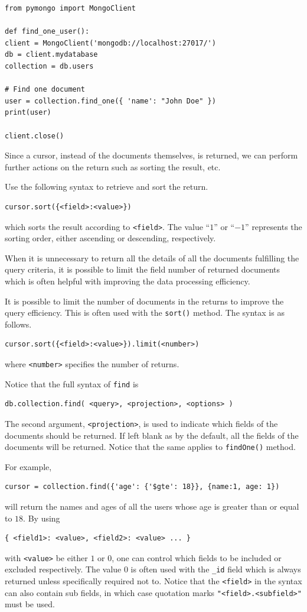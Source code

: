 \begin{lstlisting}
from pymongo import MongoClient

def find_one_user():
client = MongoClient('mongodb://localhost:27017/')
db = client.mydatabase
collection = db.users

# Find one document
user = collection.find_one({ 'name': "John Doe" })
print(user)

client.close()
\end{lstlisting}

Since a cursor, instead of the documents themselves, is returned, we can perform further actions on the return such as sorting the result, etc.

Use the following syntax to retrieve and sort the return.
\begin{lstlisting}
cursor.sort({<field>:<value>})
\end{lstlisting}
which sorts the result according to \verb|<field>|. The value ``$1$'' or ``$-1$'' represents the sorting order, either ascending or descending, respectively.

When it is unnecessary to return all the details of all the documents fulfilling the query criteria, it is possible to limit the field number of returned documents which is often helpful with improving the data processing efficiency.

It is possible to limit the number of documents in the returns to improve the query efficiency. This is often used with the \verb|sort()| method. The syntax is as follows.
\begin{lstlisting}
cursor.sort({<field>:<value>}).limit(<number>)
\end{lstlisting}
where \verb|<number>| specifies the number of returns.

Notice that the full syntax of \verb|find| is
\begin{lstlisting}
db.collection.find( <query>, <projection>, <options> )
\end{lstlisting}
The second argument, \verb|<projection>|, is used to indicate which fields of the documents should be returned. If left blank as by the default, all the fields of the documents will be returned. Notice that the same applies to \verb|findOne()| method.

For example,
\begin{lstlisting}
cursor = collection.find({'age': {'$gte': 18}}, {name:1, age: 1})
\end{lstlisting}
will return the names and ages of all the users whose age is greater than or equal to $18$. By using
\begin{lstlisting}
{ <field1>: <value>, <field2>: <value> ... }
\end{lstlisting}
with \verb|<value>| be either $1$ or $0$, one can control which fields to be included or excluded respectively. The value $0$ is often used with the \verb|_id| field which is always returned unless specifically required not to. Notice that the \verb|<field>| in the syntax can also contain sub fields, in which case quotation marks \verb|"<field>.<subfield>"| must be used.

